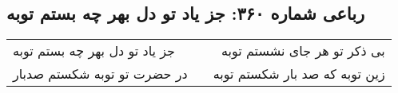 \begin{center}
\section*{رباعی شماره ۳۶۰: جز یاد تو دل بهر چه بستم توبه}
\label{sec:sh360}
\begin{longtable}{l p{0.5cm} r}
جز یاد تو دل بهر چه بستم توبه
&&
بی ذکر تو هر جای نشستم توبه
\\
در حضرت تو توبه شکستم صدبار
&&
زین توبه که صد بار شکستم توبه
\\
\end{longtable}
\end{center}
